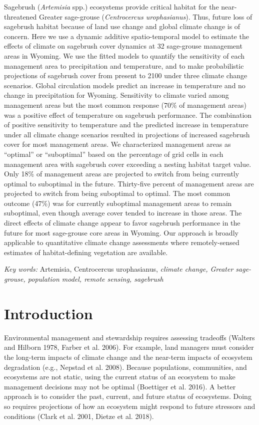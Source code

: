 \documentclass[
  12pt,
]{article}
\begin{document}
Sagebrush (\emph{Artemisia} spp.) ecosystems provide critical habitat for the near-threatened Greater sage-grouse (\emph{Centrocercus urophasianus}).
Thus, future loss of sagebrush habitat because of land use change and global climate change is of concern.
Here we use a dynamic additive spatio-temporal model to estimate the effects of climate on sagebrush cover dynamics at 32 sage-grouse management areas in Wyoming.
We use the fitted models to quantify the sensitivity of each management area to precipitation and temperature, and to make probabilistic projections of sagebrush cover from present to 2100 under three climate change scenarios.
Global circulation models predict an increase in temperature and no change in precipitation for Wyoming.
Sensitivity to climate varied among management areas but the most common response (70\% of management areas) was a positive effect of temperature on sagebrush performance.
The combination of positive sensitivity to temperature and the predicted increase in temperature under all climate change scenarios resulted in projections of increased sagebrush cover for most management areas.
We characterized management areas as ``optimal'' or ``suboptimal'' based on the percentage of grid cells in each management area with sagebrush cover exceeding a nesting habitat target value.
Only 18\% of management areas are projected to switch from being currently optimal to suboptimal in the future.
Thirty-five percent of management areas are projected to switch from being suboptimal to optimal.
The most common outcome (47\%) was for currently suboptimal management areas to remain suboptimal, even though average cover tended to increase in those areas.
The direct effects of climate change appear to favor sagebrush performance in the future for most sage-grouse core areas in Wyoming.
Our approach is broadly applicable to quantitative climate change assessments where remotely-sensed estimates of habitat-defining vegetation are available.

\emph{Key words:} Artemisia, Centrocercus urophasianus, \emph{climate change, Greater sage-grouse, population model, remote sensing, sagebrush}

\hypertarget{introduction}{%
\section{Introduction}\label{introduction}}

Environmental management and stewardship requires assessing tradeoffs (Walters and Hilborn 1978, Farber et al. 2006).
For example, land managers must consider the long-term impacts of climate change and the near-term impacts of ecosystem degradation (e.g., Nepstad et al. 2008).
Because populations, communities, and ecosystems are not static, using the current status of an ecosystem to make management decisions may not be optimal (Boettiger et al. 2016).
A better approach is to consider the past, current, and future status of ecosystems.
Doing so requires projections of how an ecosystem might respond to future stressors and conditions (Clark et al. 2001, Dietze et al. 2018).
\end{document}
